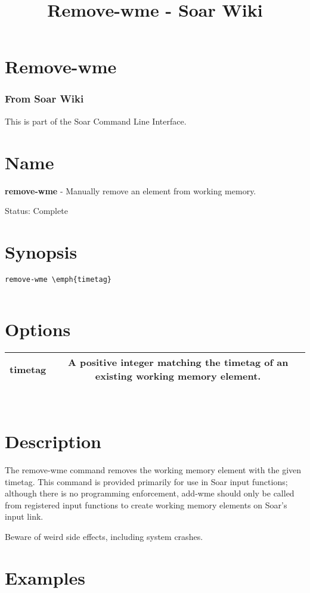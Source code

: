\documentclass[10pt]{article}
\title{Remove-wme - Soar Wiki}
\begin{document}
\section*{Remove-wme}
\subsubsection*{From Soar Wiki}


 This is part of the Soar Command Line Interface. 
\section*{ Name }


 \textbf{remove-wme}
 - Manually remove an element from working memory. 


 Status: Complete
\section*{ Synopsis }
\begin{verbatim}
remove-wme \emph{timetag}


\end{verbatim}
\section*{ Options }


\begin{tabular}{|c|c|}
\hline 
 timetag  & A positive integer matching the timetag of an existing working memory element.  \\
 \hline 

\end{tabular}



 \\ 

\section*{ Description }


 The remove-wme command removes the working memory element with the given timetag. This command is provided primarily for use in Soar input functions; although there is no programming enforcement, add-wme should only be called from registered input functions to create working memory elements on Soar's input link. 


 Beware of weird side effects, including system crashes. 
\section*{ Examples }
\end{document}
